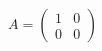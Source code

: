 \documentclass[preview]{standalone}
\begin{document}
\begin{align*}
A = \begin{pmatrix} 1 & 0 \\ 0 & 0 \end{pmatrix}
\end{align*}
\end{document}
